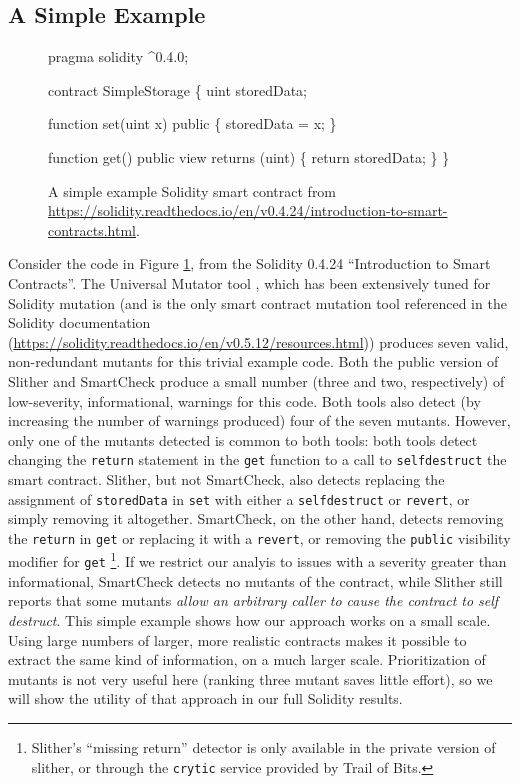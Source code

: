 \subsection{A Simple Example}

\begin{figure}
{\scriptsize
\begin{code}
pragma solidity ^0.4.0;

contract SimpleStorage \{
    uint storedData;

    function set(uint x) public \{
        storedData = x;
    \}

    function get() public view returns (uint) \{
        return storedData;
    \}
  \}
\end{code}
}
\caption{A simple example Solidity smart contract from \url{https://solidity.readthedocs.io/en/v0.4.24/introduction-to-smart-contracts.html}.}
\label{fig:sol424intro}
\end{figure}

Consider the code in Figure \ref{fig:sol424intro}, from the Solidity 0.4.24 ``Introduction to Smart Contracts''.  The Universal Mutator tool \cite{universalmutator,regexpMut}, which has been extensively tuned for Solidity mutation (and is the only smart contract mutation tool referenced in the Solidity documentation (\url{https://solidity.readthedocs.io/en/v0.5.12/resources.html})) produces seven valid, non-redundant mutants for this trivial example code.  Both the public version of Slither \cite{slither} and SmartCheck \cite{smartcheck} produce a small number (three and two, respectively) of low-severity, informational, warnings for this code.  Both tools also detect (by increasing the number of warnings produced) four of the seven mutants.  However, only one of the mutants detected is common to both tools: both tools detect changing the {\tt return} statement in the {\tt get} function to a call to {\tt selfdestruct} the smart contract.  Slither, but not SmartCheck, also detects replacing the assignment of {\tt storedData} in {\tt set} with either a {\tt selfdestruct} or {\tt revert}, or simply removing it altogether.  SmartCheck, on the other hand, detects removing the {\tt return} in {\tt get} or replacing it with a {\tt revert}, or removing the {\tt public} visibility modifier for {\tt get} \footnote{Slither's ``missing return'' detector is only available in the private version of slither, or through the {\tt crytic} service provided by Trail of Bits.}.  If we restrict our analyis to issues with a severity greater than informational, SmartCheck detects no mutants of the contract, while Slither still reports that some mutants \emph{allow an arbitrary caller to cause the contract to self destruct}.  This simple example shows how our approach works on a small scale.  Using large numbers of larger, more realistic contracts makes it possible to extract the same kind of information, on a much larger scale.  Prioritization of mutants is not very useful here (ranking three mutant saves little effort), so we will show the utility of that approach in our full Solidity results.

